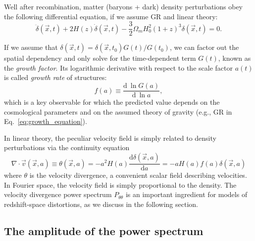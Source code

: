     Well after recombination,
    matter (baryons + dark) density perturbations obey the following differential equation, if we 
    assume GR and linear theory:
    \begin{equation}
        \ddot\delta(\vec{x}, t) + 2H(z)\dot\delta(\vec{x}, t) - \frac{3}{2} \Omega_m H_0^2 (1+z)^3 \delta(\vec{x}, t) = 0. 
        \label{eq:growth_equation}
    \end{equation}

    If we assume that $\delta(\vec{x}, t) = \delta(\vec{x}, t_0) G(t)/G(t_0)$, we can factor out 
    the spatial dependency and only solve for the time-dependent term $G(t)$, known as the 
    \emph{growth factor}. Its logarithmic derivative with respect to the scale factor $a(t)$ 
    is called \emph{growth rate} of structures:
    \begin{equation}
        f(a) \equiv \frac{ \mathrm{d}~ \ln G(a)}{\mathrm{d}~ \ln a},
        \label{eq:growth_rate}
    \end{equation}
    which is a key observable for which the predicted value 
    depends on the cosmological parameters and on the assumed
    theory of gravity (e.g., GR in Eq.~\ref{eq:growth_equation}). 

    In linear theory, the peculiar velocity field is simply related to 
    density perturbations via the continuity equation 
    \begin{equation}
        \nabla \cdot \vec{v}(\vec{x}, a) 
            \equiv \theta(\vec{x}, a) 
            = -a^2 H(a) \frac{\mathrm{d}\delta(\vec{x}, a)}{\mathrm{d}a} 
            = -a H(a) f(a) \delta(\vec{x}, a) 
        \label{eq:velocity_from_density}
    \end{equation}
    where $\theta$ is the velocity divergence, a convenient scalar field describing velocities. 
    In Fourier space, the velocity field is simply proportional to the density. 
    The velocity divergence power spectrum $P_{\theta \theta}$ is an important ingredient 
    for models of redshift-space distortions, as we discuss in the following section. 

    \subsection{The amplitude of the power spectrum}
    \label{intro:lss:amplitude_power_spectrum} 
    
